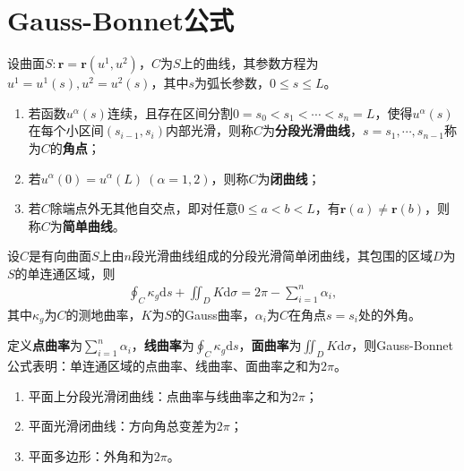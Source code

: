 \documentclass[../../main.tex]{subfiles}%
\begin{document}
\section{Gauss-Bonnet公式}

\begin{definition}
设曲面$S:\boldsymbol{r}=\boldsymbol{r}(u^1,u^2)$，$C$为$S$上的曲线，其参数方程为$u^1=u^1(s),u^2=u^2(s)$，其中$s$为弧长参数，$0\leqslant s\leqslant L$。
\begin{enumerate}[(1)]
\item 若函数$u^\alpha(s)$连续，且存在区间分割$0=s_0<s_1<\cdots<s_n=L$，使得$u^\alpha(s)$在每个小区间$(s_{i-1},s_i)$内部光滑，则称$C$为\textbf{分段光滑曲线}，$s=s_1,\cdots,s_{n-1}$称为$C$的\textbf{角点}；
\item 若$u^\alpha(0)=u^\alpha(L)\ (\alpha=1,2)$，则称$C$为\textbf{闭曲线}；
\item 若$C$除端点外无其他自交点，即对任意$0\leqslant a<b<L$，有$\boldsymbol{r}(a)\neq\boldsymbol{r}(b)$，则称$C$为\textbf{简单曲线}。
\end{enumerate}
\end{definition}

\begin{theorem}
设$C$是有向曲面$S$上由$n$段光滑曲线组成的分段光滑简单闭曲线，其包围的区域$D$为$S$的单连通区域，则
\begin{align}
\oint_{C}\kappa_g\mathrm{d}s+\iint_{D}K\mathrm{d}\sigma=2\pi-\sum_{i=1}^{n}\alpha_i,\label{eq:gaussbonnet1}
\end{align}
其中$\kappa_g$为$C$的测地曲率，$K$为$S$的Gauss曲率，$\alpha_i$为$C$在角点$s=s_i$处的外角。
\end{theorem}

\begin{remark}
定义\textbf{点曲率}为$\sum_{i=1}^{n}\alpha_i$，\textbf{线曲率}为$\oint_{C}\kappa_g\mathrm{d}s$，\textbf{面曲率}为$\iint_{D}K\mathrm{d}\sigma$，则Gauss-Bonnet公式表明：单连通区域的点曲率、线曲率、面曲率之和为$2\pi$。
\begin{enumerate}[(1)]
\item 平面上分段光滑闭曲线：点曲率与线曲率之和为$2\pi$；
\item 平面光滑闭曲线：方向角总变差为$2\pi$；
\item 平面多边形：外角和为$2\pi$。
\end{enumerate}
\end{remark}
\end{document}
